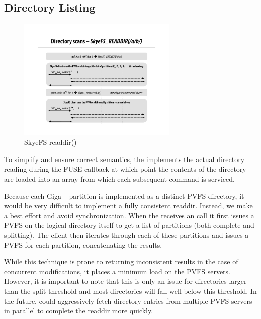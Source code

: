 \documentclass[onecolumn, 11pt, letterpaper]{article}
\begin{document}
\subsection{Directory Listing}
\begin{figure}
\begin{center}
\includegraphics[width=3in]{figure-readdir}
\end{center}
\caption{SkyeFS readdir()}
\end{figure}
To simplify  and ensure correct semantics, the
 implements the actual directory reading during the FUSE
 callback at which point the contents of the directory are loaded
into an array from which each subsequent  command is serviced.

Because each Giga+ partition is implemented as a distinct PVFS directory, it
would be very difficult to implement a fully consistent readdir.  Instead, we
make a best effort and avoid synchronization.  When the
 receives an  call it first issues a PVFS
 on the logical directory itself to get a list of partitions
(both complete and splitting).  The client then iterates through each of these
partitions and issues a PVFS  for each partition, concatenating
the results.  

While this technique is prone to returning inconsistent results in the case of
concurrent modifications, it places a minimum load on the PVFS servers.
However, it is important to note that this is only an issue for directories
larger than the split threshold and most directories will fall well below this
threshold.  In the future,  could aggressively fetch
directory entries from multiple PVFS servers in parallel to complete the
readdir more quickly.
\end{document}
